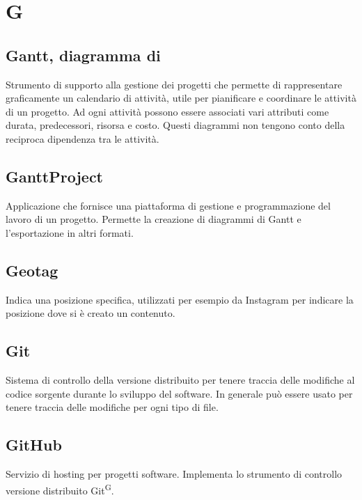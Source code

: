 \section{G}

\subsection{Gantt, diagramma di}
Strumento di supporto alla gestione dei progetti che permette di rappresentare graficamente un calendario di attività, utile per pianificare e coordinare le attività di un progetto. Ad ogni attività possono essere associati vari attributi come durata, predecessori, risorsa e costo. Questi diagrammi non tengono conto della reciproca dipendenza tra le attività.

\subsection{GanttProject}
Applicazione che fornisce una piattaforma di gestione e programmazione del lavoro di un progetto. Permette la creazione di diagrammi di Gantt\glo{} e l'esportazione in altri formati.

\subsection{Geotag}
Indica una posizione specifica, utilizzati per esempio da Instagram per indicare la posizione dove si è creato un contenuto.

\subsection{Git}
Sistema di controllo della versione distribuito per tenere traccia delle modifiche al codice sorgente durante lo sviluppo del software. In generale può essere usato per tenere traccia delle modifiche per ogni tipo di file.

\subsection{GitHub}
Servizio di hosting per progetti software. Implementa lo strumento di controllo versione distribuito Git\textsuperscript{G}.




\clearpage